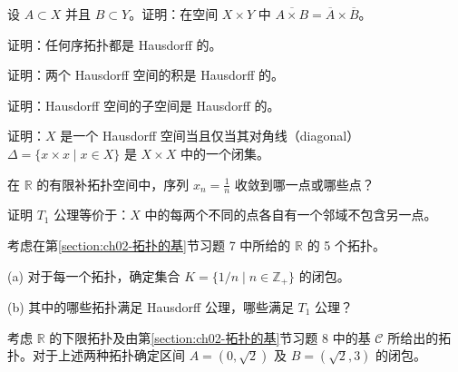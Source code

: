 \documentclass[../../main.tex]{subfiles}
\begin{document}
\begin{exercise}\label{exercise:ch02-闭集与极限点-9}
设 $A \subset X$ 并且 $B \subset Y$。证明：在空间 $X \times Y$ 中 $\overline{A \times B} = \overline{A} \times \overline{B}$。
\end{exercise}

\begin{exercise}\label{exercise:ch02-闭集与极限点-10}
证明：任何序拓扑都是 Hausdorff 的。
\end{exercise}

\begin{exercise}\label{exercise:ch02-闭集与极限点-11}
证明：两个 Hausdorff 空间的积是 Hausdorff 的。
\end{exercise}

\begin{exercise}\label{exercise:ch02-闭集与极限点-12}
证明：Hausdorff 空间的子空间是 Hausdorff 的。
\end{exercise}

\begin{exercise}\label{exercise:ch02-闭集与极限点-13}
证明：$X$ 是一个 Hausdorff 空间当且仅当其对角线（diagonal）$\Delta = \{x \times x \mid x \in X\}$ 是 $X \times X$ 中的一个闭集。
\end{exercise}

\begin{exercise}\label{exercise:ch02-闭集与极限点-14}
在 $\mathbb{R}$ 的有限补拓扑空间中，序列 $x_{n} = \frac{1}{n}$ 收敛到哪一点或哪些点？
\end{exercise}

\begin{exercise}\label{exercise:ch02-闭集与极限点-15}
证明 $T_{1}$ 公理等价于：$X$ 中的每两个不同的点各自有一个邻域不包含另一点。
\end{exercise}

\begin{exercise}\label{exercise:ch02-闭集与极限点-16}
考虑在第\cref{section:ch02-拓扑的基}节习题 7 中所给的 $\mathbb{R}$ 的 5 个拓扑。

(a) 对于每一个拓扑，确定集合 $K = \{1/n \mid n \in \mathbb{Z}_{+}\}$ 的闭包。

(b) 其中的哪些拓扑满足 Hausdorff 公理，哪些满足 $T_{1}$ 公理？
\end{exercise}

\begin{exercise}\label{exercise:ch02-闭集与极限点-17}
考虑 $\mathbb{R}$ 的下限拓扑及由第\cref{section:ch02-拓扑的基}节习题 8 中的基 $\mathcal{C}$ 所给出的拓扑。对于上述两种拓扑确定区间 $A = (0, \sqrt{2})$ 及 $B = (\sqrt{2}, 3)$ 的闭包。
\end{exercise}
\end{document}
